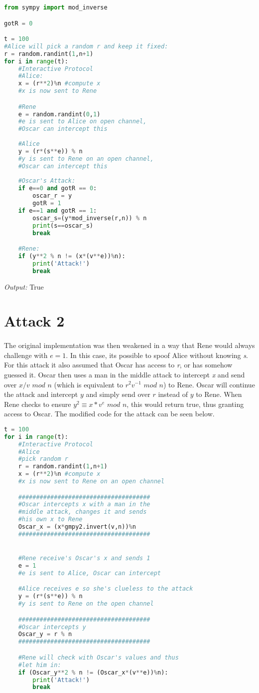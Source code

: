 \begin{lstlisting}[language=Python]
from sympy import mod_inverse

gotR = 0

t = 100
#Alice will pick a random r and keep it fixed:
r = random.randint(1,n+1)
for i in range(t):
	#Interactive Protocol
	#Alice:
	x = (r**2)%n #compute x
	#x is now sent to Rene

	#Rene
	e = random.randint(0,1)
	#e is sent to Alice on open channel, 
	#Oscar can intercept this
	
	#Alice
	y = (r*(s**e)) % n
	#y is sent to Rene on an open channel, 
	#Oscar can intercept this
	
	#Oscar's Attack:
	if e==0 and gotR == 0:
		oscar_r = y
		gotR = 1
	if e==1 and gotR == 1:
		oscar_s=(y*mod_inverse(r,n)) % n
		print(s==oscar_s)
		break

	#Rene:
	if (y**2 % n != (x*(v**e))%n):
		print('Attack!')
		break
\end{lstlisting}
\textit{Output:} True

\section{Attack 2}
\paragraph{ }The original implementation was then weakened in a way that Rene would always challenge with $e=1$. In this case, its possible to spoof Alice without knowing \textit{s}. For this attack it also assumed that Oscar has access to \textit{r}, or has somehow guessed it. Oscar then uses a man in the middle attack to intercept \textit{x} and send over $x/v$ $mod$ $n$ (which is equivalent to $r^2v^{-1}$ $mod$ $n$) to Rene. Oscar will continue the attack and intercept $y$ and simply send over $r$ instead of $y$ to Rene. When Rene checks to ensure $y^2 \equiv x*v^e$ $mod$ $n$, this would return true, thus granting access to Oscar. The modified code for the attack can be seen below.

\begin{lstlisting}[language=Python]
t = 100
for i in range(t):
	#Interactive Protocol
	#Alice
	#pick random r
	r = random.randint(1,n+1)
	x = (r**2)%n #compute x
	#x is now sent to Rene on an open channel

	#####################################
	#Oscar intercepts x with a man in the
	#middle attack, changes it and sends
	#his own x to Rene
	Oscar_x = (x*gmpy2.invert(v,n))%n
	#####################################


	#Rene receive's Oscar's x and sends 1
	e = 1
	#e is sent to Alice, Oscar can intercept

	#Alice receives e so she's clueless to the attack
	y = (r*(s**e)) % n
	#y is sent to Rene on the open channel

	#####################################
	#Oscar intercepts y
	Oscar_y = r % n 
	#####################################

	#Rene will check with Oscar's values and thus
	#let him in:
	if (Oscar_y**2 % n != (Oscar_x*(v**e))%n):
		print('Attack!')
		break
\end{lstlisting}